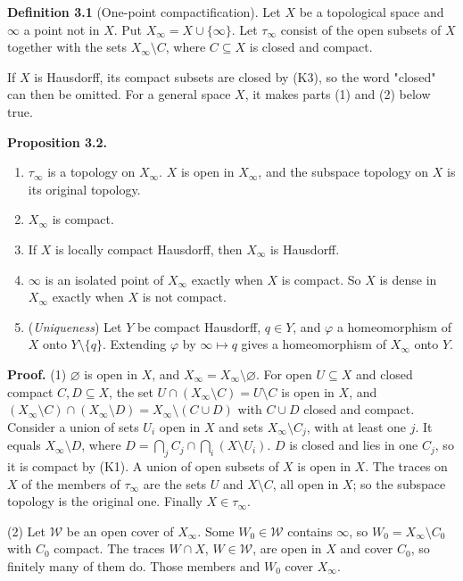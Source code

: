 \documentclass[
  english,
  11pt,
  a4paper,
]{article}
\providecommand{\tightlist}{%
  \setlength{\itemsep}{0pt}\setlength{\parskip}{0pt}}
\begin{document}
\textbf{Definition 3.1} (One-point compactification). Let \(X\) be a
topological space and \(\infty\) a point not in \(X\). Put
\(X_\infty=X\cup\{\infty\}\). Let \(\tau_\infty\) consist of the open
subsets of \(X\) together with the sets \(X_\infty\setminus C\), where
\(C\subseteq X\) is closed and compact.

If \(X\) is Hausdorff, its compact subsets are closed by (K3), so the
word "closed" can then be omitted. For a general space \(X\), it makes
parts (1) and (2) below true.

\textbf{Proposition 3.2.}

\begin{enumerate}
\tightlist
\item
  \(\tau_\infty\) is a topology on \(X_\infty\). \(X\) is open in
  \(X_\infty\), and the subspace topology on \(X\) is its original
  topology.
\item
  \(X_\infty\) is compact.
\item
  If \(X\) is locally compact Hausdorff, then \(X_\infty\) is Hausdorff.
\item
  \(\infty\) is an isolated point of \(X_\infty\) exactly when \(X\) is
  compact. So \(X\) is dense in \(X_\infty\) exactly when \(X\) is not
  compact.
\item
  (\emph{Uniqueness}) Let \(Y\) be compact Hausdorff, \(q\in Y\), and
  \(\varphi\) a homeomorphism of \(X\) onto \(Y\setminus\{q\}\).
  Extending \(\varphi\) by \(\infty\mapsto q\) gives a homeomorphism of
  \(X_\infty\) onto \(Y\).
\end{enumerate}

\textbf{Proof.} (1) \(\varnothing\) is open in \(X\), and
\(X_\infty=X_\infty\setminus\varnothing\). For open \(U\subseteq X\) and
closed compact \(C,D\subseteq X\), the set
\(U\cap(X_\infty\setminus C)=U\setminus C\) is open in \(X\), and
\((X_\infty\setminus C)\cap(X_\infty\setminus D)=X_\infty\setminus(C\cup D)\)
with \(C\cup D\) closed and compact. Consider a union of sets \(U_i\)
open in \(X\) and sets \(X_\infty\setminus C_j\), with at least one
\(j\). It equals \(X_\infty\setminus D\), where
\(D=\bigcap_jC_j\cap\bigcap_i(X\setminus U_i)\). \(D\) is closed and
lies in one \(C_j\), so it is compact by (K1). A union of open subsets
of \(X\) is open in \(X\). The traces on \(X\) of the members of
\(\tau_\infty\) are the sets \(U\) and \(X\setminus C\), all open in
\(X\); so the subspace topology is the original one. Finally
\(X\in\tau_\infty\).

(2) Let \(\mathcal W\) be an open cover of \(X_\infty\). Some
\(W_0\in\mathcal W\) contains \(\infty\), so
\(W_0=X_\infty\setminus C_0\) with \(C_0\) compact. The traces
\(W\cap X\), \(W\in\mathcal W\), are open in \(X\) and cover \(C_0\), so
finitely many of them do. Those members and \(W_0\) cover \(X_\infty\).
\end{document}
